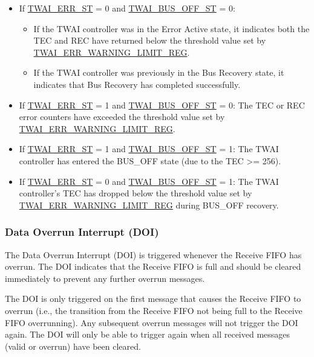 \documentclass[main\_\_EN.tex]{subfiles}
\begin{document}
\begin{itemize}
    \item If \hyperref[fielddesc:TWAIERRST]{TWAI\_ERR\_ST} = 0 and \hyperref[fielddesc:TWAIBUSOFFST]{TWAI\_BUS\_OFF\_ST} = 0:
    \begin{itemize}
        \item If the TWAI controller was in the Error Active state, it indicates both the TEC and REC have returned below the threshold value set by \hyperref[regdesc:TWAIERRWARNINGLIMITREG]{TWAI\_ERR\_WARNING\_LIMIT\_REG}.
        \item If the TWAI controller was previously in the Bus Recovery state, it indicates that Bus Recovery has completed successfully.
    \end{itemize}
    \item If \hyperref[fielddesc:TWAIERRST]{TWAI\_ERR\_ST} = 1 and \hyperref[fielddesc:TWAIBUSOFFST]{TWAI\_BUS\_OFF\_ST} = 0: The TEC or REC error counters have exceeded the threshold value set by  \hyperref[regdesc:TWAIERRWARNINGLIMITREG]{TWAI\_ERR\_WARNING\_LIMIT\_REG}.
    \item If  \hyperref[fielddesc:TWAIERRST]{TWAI\_ERR\_ST} = 1 and \hyperref[fielddesc:TWAIBUSOFFST]{TWAI\_BUS\_OFF\_ST} = 1: The TWAI controller has entered the BUS\_OFF state (due to the TEC >= 256).
    \item If  \hyperref[fielddesc:TWAIERRST]{TWAI\_ERR\_ST} = 0 and \hyperref[fielddesc:TWAIBUSOFFST]{TWAI\_BUS\_OFF\_ST} = 1: The TWAI controller’s TEC has dropped below the threshold value set by \hyperref[regdesc:TWAIERRWARNINGLIMITREG]{TWAI\_ERR\_WARNING\_LIMIT\_REG} during BUS\_OFF recovery.
\end{itemize}

\subsubsection{Data Overrun Interrupt (DOI)}
The Data Overrun Interrupt (DOI) is triggered whenever the Receive FIFO has overrun. The DOI indicates that the Receive FIFO is full and should be cleared immediately to prevent any further overrun messages.

The DOI is only triggered on the first message that causes the Receive FIFO to overrun (i.e., the transition from the Receive FIFO not being full to the Receive FIFO overrunning). Any subsequent overrun messages will not trigger the DOI again. The DOI will only be able to trigger again when all received messages (valid or overrun) have been cleared.
\end{document}
